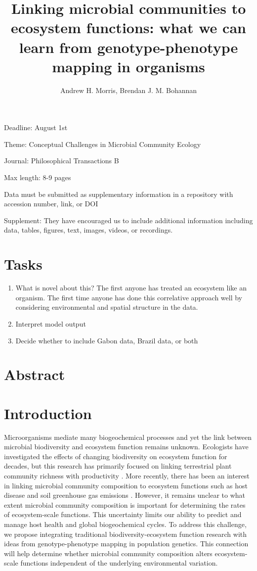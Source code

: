 \documentclass{article}
\title{Linking microbial communities to ecosystem functions: what we can learn
from genotype-phenotype mapping in organisms}
\author{Andrew H. Morris, Brendan J. M. Bohannan}
\begin{document}
\maketitle



Deadline: August 1st

Theme: Conceptual Challenges in Microbial Community Ecology

Journal: Philosophical Transactions B

Max length: 8-9 pages

Data must be submitted as supplementary information in a repository with
accession number, link, or DOI

Supplement: They have encouraged us to include additional information including
data, tables, figures, text, images, videos, or recordings.

\section*{Tasks} 
\begin{enumerate}
\item What is novel about this? The first anyone has treated an ecosystem like an
organism. The first time anyone has done this correlative approach well
by considering environmental and spatial structure in the data. 
\item Interpret model output
\item Decide whether to include Gabon data, Brazil data, or both
\end{enumerate}

\section*{Abstract}



\section{Introduction} 

Microorganisms mediate many biogeochemical processes and yet the link between
microbial biodiversity and ecosystem function remains unknown. 
Ecologists have investigated the effects of changing
biodiversity on ecosystem function for decades, but this research has primarily
focused on linking terrestrial plant community richness with productivity
\citep{hooper2005}. More recently, there has been an interest in linking
microbial community composition to ecosystem functions such as host disease 
and soil greenhouse gas emissions \citep{schimel1998, singh2010}. 
However, it remains unclear to what extent 
microbial community composition is important for determining the rates of ecosystem-scale
functions.  This uncertainty limits our ability to predict and manage host
health and global biogeochemical cycles. To
address this challenge, we propose integrating traditional
biodiversity-ecosystem function research with ideas from genotype-phenotype
mapping in population genetics. This connection will help determine
whether microbial community
composition alters ecosystem-scale functions independent
of the underlying environmental variation.
\end{document}
